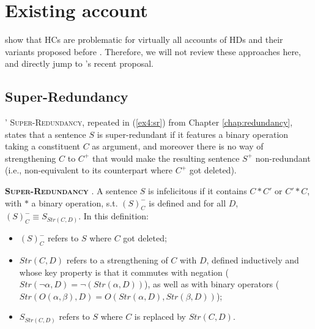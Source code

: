 \section{Existing account}\label{sec6:prev-approaches}

\citet{Mandelkern2018} show that HCs are problematic for virtually all accounts of HDs and their variants proposed before \citet{Kalomoiros2024}. Therefore, we will not review these approaches here, and directly jump to  \citeauthor{Kalomoiros2024}'s recent proposal.



\subsection{Super-Redundancy}
\citeauthor{Kalomoiros2024}' \textsc{Super-Redundancy}, repeated in (\ref{ex4:sr}) from Chapter \ref{chap:redundancy}, states that a sentence $S$ is super-redundant if it features a binary operation taking a constituent $C$ as argument, and moreover there is no way of strengthening $C$ to $C^+$ that would make the resulting sentence $S^+$ non-redundant (i.e., non-equivalent to its counterpart where $C^+$ got deleted).

\begin{exe}
	 {\textsc{\textbf{Super-Redundancy}} \citep{Kalomoiros2024}. A sentence $S$ is infelicitous if it contains $C \ast C'$ or $C' \ast C$, with $\ast$ a binary operation, s.t. $(S)^-_C$ is defined and for all $D$, $(S)^-_C \equiv S_{Str(C, D)}$. In this definition:
		\begin{itemize}
			\item $(S)^-_C$ refers to $S$ where $C$ got deleted;
			\item  $Str(C, D)$ refers to a strengthening of $C$ with $D$, defined inductively and whose key property is that it commutes with negation ($Str(\neg\alpha, D) = \neg (Str(\alpha, D))$), as well as with binary operators ($Str(O(\alpha, \beta), D) = O(Str(\alpha, D), Str(\beta, D))$);
			\item $S_{Str(C, D)}$ refers to $S$ where $C$ is replaced by $Str(C, D)$.
	\end{itemize}}
\end{exe}


